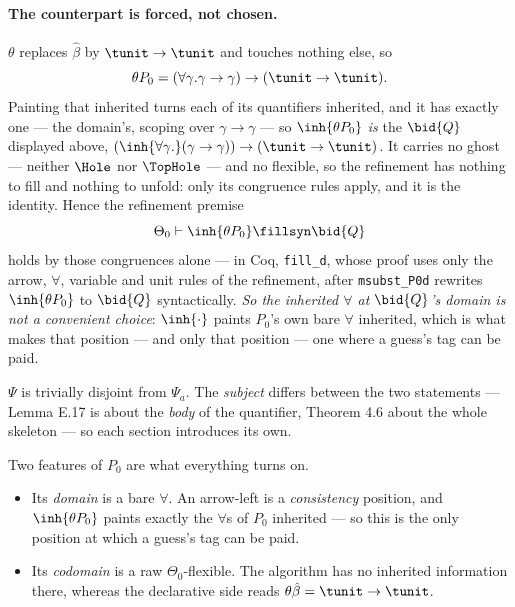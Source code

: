 \documentclass[11pt,a4paper]{article}
\theoremstyle{definition}
\newcommand{\coq}[1]{\texttt{\small #1}}
\newcommand{\Qcex}{(\inh{\forall\gamma.}(\gamma\to\gamma))
                    \to (\tunit\to\tunit)}
\begin{document}
\paragraph{The counterpart is forced, not chosen.}
$\theta$ replaces $\hat\beta$ by $\tunit\to\tunit$ and touches nothing
else, so
\[
  \theta P_0 = (\forall\gamma.\gamma\to\gamma) \to (\tunit\to\tunit) .
\]
Painting that inherited turns each of its quantifiers inherited, and it has
exactly one --- the domain's, scoping over $\gamma\to\gamma$ --- so
$\inh{\theta P_0}$ \emph{is} the $\bid{Q}$ displayed above,
$\Qcex$.
It carries no ghost --- neither $\Hole$ nor $\TopHole$ --- and no
flexible, so the refinement has nothing to fill and nothing to unfold:
only its congruence rules apply, and it is the identity.  Hence the
refinement premise
\[
  \Theta_0\vdash\inh{\theta P_0}\fillsyn\bid{Q}
\]
holds by those congruences alone --- in Coq, \coq{fill\_d}, whose proof
uses only the arrow, $\forall$, variable and unit rules of the refinement,
after \coq{msubst\_P0d} rewrites $\inh{\theta P_0}$ to $\bid{Q}$
syntactically.
\emph{So the inherited $\forall$ at $\bid{Q}$'s domain is not a
convenient choice}: $\inh{\cdot}$ paints $P_0$'s own bare $\forall$
inherited, which is what makes that position --- and only that position ---
one where a guess's tag can be paid.

\medskip\noindent
$\Psi$ is trivially disjoint from $\Psi_a$.  The \emph{subject} differs
between the two statements --- Lemma E.17 is about the \emph{body} of the
quantifier, Theorem 4.6 about the whole skeleton --- so each section
introduces its own.

Two features of $P_0$ are what everything turns on.
\begin{itemize}
\item Its \emph{domain} is a bare $\forall$.  An arrow-left is a
  \emph{consistency} position, and $\inh{\theta P_0}$ paints exactly the
  $\forall$s of $P_0$ inherited --- so this is the only position at which
  a guess's tag can be paid.
\item Its \emph{codomain} is a raw $\Theta_0$-flexible.  The algorithm has
  no inherited information there, whereas the declarative side reads
  $\theta\hat\beta = \tunit\to\tunit$.
\end{itemize}
\end{document}
